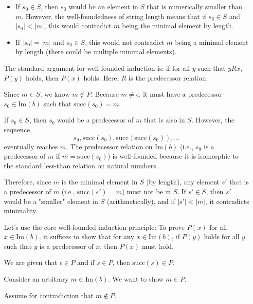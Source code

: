 \documentclass[12pt, a4paper]{article}
\begin{document}
\begin{itemize}
    \item If \( s_0 \in S \), then \( s_0 \) would be an element in \( S \) that is numerically smaller than \( m \). However, the well-foundedness of string length means that if \( s_0 \in S \) and \( |s_0| < |m| \), this would contradict \( m \) being the minimal element by length.
    \item If \( |s_0| = |m| \) and \( s_0 \in S \), this would not contradict \( m \) being a minimal element by length (there could be multiple minimal elements).
\end{itemize}

The standard argument for well-founded induction is: if for all \( y \) such that \( y R x \), \( P(y) \) holds, then \( P(x) \) holds. Here, \( R \) is the predecessor relation.

Since \( m \in S \), we know \( m \notin P \). Because \( m \neq \epsilon \), it must have a predecessor \( s_0 \in \mathrm{Im}(b) \) such that \(\mathrm{succ}(s_0) = m\).

If \( s_0 \in S \), then \( s_0 \) would be a predecessor of \( m \) that is also in \( S \). However, the sequence
\[
s_0, \mathrm{succ}(s_0), \mathrm{succ}(\mathrm{succ}(s_0)), \ldots
\]
eventually reaches \( m \). The predecessor relation on \(\mathrm{Im}(b)\) (i.e., \( s_0 \) is a predecessor of \( m \) if \( m = \mathrm{succ}(s_0) \)) is well-founded because it is isomorphic to the standard less-than relation on natural numbers.

Therefore, since \( m \) is the minimal element in \( S \) (by length), any element \( s' \) that is a predecessor of \( m \) (i.e., \(\mathrm{succ}(s') = m\)) must not be in \( S \). If \( s' \in S \), then \( s' \) would be a "smaller" element in \( S \) (arithmetically), and if \( |s'| < |m| \), it contradicts minimality.

Let's use the core well-founded induction principle: To prove \( P(x) \) for all \( x \in \mathrm{Im}(b) \), it suffices to show that for any \( x \in \mathrm{Im}(b) \), if \( P(y) \) holds for all \( y \) such that \( y \) is a predecessor of \( x \), then \( P(x) \) must hold.

We are given that \( \epsilon \in P \) and if \( s \in P \), then \( \mathrm{succ}(s) \in P \).

Consider an arbitrary \( m \in \mathrm{Im}(b) \). We want to show \( m \in P \).

Assume for contradiction that \( m \notin P \).
\end{document}

